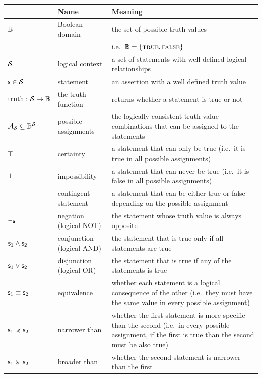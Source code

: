 	\begin{tabular}{p{} p{} p{}}
		& Name & Meaning  \\ 
		\hline 
		$\mathbb{B}$  & Boolean domain & the set of possible truth values \\ 
		&  & i.e.~$\mathbb{B} = \{\textup{\textsc{true}}, \textup{\textsc{false}}\}$ \\ 
		\hline 
		$\mathcal{S}$ & logical context & a set of statements with well defined logical relationships \\ 
		\hline 
		$\mathsf{s} \in \mathcal{S}$ & statement & an assertion with a well defined truth value \\ 
		\hline 
		$\operatorname{truth} : \mathcal{S} \to \mathbb{B}$ & the truth function & returns whether a statement is true or not  \\ 
		\hline 
		$\mathcal{A}_{\mathcal{S}} \subseteq \mathbb{B}^{\mathcal{S}}$& possible assignments & the logically consistent truth value combinations that can be assigned to the statements \\ 
		\hline 
		$\top$ & certainty & a statement that can only be true (i.e.~it is true in all possible assignments) \\ 
		\hline 
		$\bot$ & impossibility & a statement that can never be true (i.e.~it is false in all possible assignments) \\ 
		\hline 
		& contingent statement & a statement that can be either true or false depending on the possible assignment \\ 
		\hline 
		$\neg \mathsf{s}$ & negation (logical NOT) & the statement whose truth value is always opposite \\ 
		\hline 
		$\mathsf{s}_1 \wedge \mathsf{s}_2$ & conjunction (logical AND) & the statement that is true only if all statements are true \\ 
		\hline 
		$\mathsf{s}_1 \vee \mathsf{s}_2$ & disjunction (logical OR) & the statement that is true if any of the statements is true \\ 
		\hline 
		$\mathsf{s}_1 \equiv \mathsf{s}_2$ & equivalence & whether each statement is a logical consequence of the other (i.e.~they must have the same value in every possible assignment) \\ 
		\hline 
		$\mathsf{s}_1 \preccurlyeq \mathsf{s}_2$ & narrower than & whether the first statement is more specific than the second (i.e.~in every possible assignment, if the first is true than the second must be also true) \\ 
		\hline 
		$\mathsf{s}_1 \succcurlyeq \mathsf{s}_2$ & broader than & whether the second statement is narrower than the first \\ 

\end{tabular}
